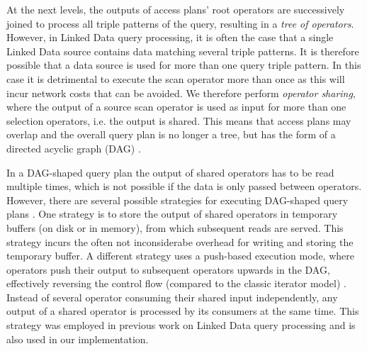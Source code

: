 At the next levels, the outputs of access plans' root operators are
successively joined to process all triple patterns of the query,
resulting in a \emph{tree of operators}. However, in Linked Data query
processing, it is often the case that a single Linked Data source
contains data matching several triple patterns. It is therefore
possible that a data source is used for more than one query triple
pattern. In this case it is detrimental to execute the scan operator
more than once as this will incur network costs that can be
avoided. We therefore perform \emph{operator sharing}, where the
output of a source scan operator is used as input for more than one
selection operators, i.e. the output is shared. This means that access
plans may overlap and the overall query plan is no longer a tree, but
has the form of a directed acyclic graph (DAG) \cite{Neumann_2005}.

In a DAG-shaped query plan the output of shared operators has to be
read multiple times, which is not possible if the data is only passed
between operators. However, there are several possible strategies for
executing DAG-shaped query plans \cite{Neumann_2005}. One strategy is
to store the output of shared operators in temporary buffers (on disk
or in memory), from which subsequent reads are served. This strategy
incurs the often not inconsiderabe overhead for writing and storing
the temporary buffer. A different strategy uses a push-based execution
mode, where operators push their output to subsequent operators
upwards in the DAG, effectively reversing the control flow (compared
to the classic iterator model) \cite{Neumann_2005}. Instead of several
operator consuming their shared input independently, any output of a
shared operator is processed by its consumers at the same time. This
strategy was employed in previous work on Linked Data query processing
\cite{ladwig_linked_2010,sihjoin_2011} and is also used in our
implementation.

%  	

